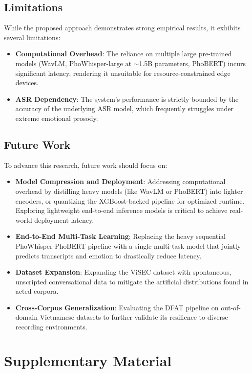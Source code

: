 \documentclass[12pt,a4paper]{report}
\begin{document}
\section{Limitations}
While the proposed approach demonstrates strong empirical results, it exhibits several limitations:
\begin{itemize}
    \item \textbf{Computational Overhead}: The reliance on multiple large pre-trained models (WavLM, PhoWhisper-large at $\sim$1.5B parameters, PhoBERT) incurs significant latency, rendering it unsuitable for resource-constrained edge devices.
    \item \textbf{ASR Dependency}: The system's performance is strictly bounded by the accuracy of the underlying ASR model, which frequently struggles under extreme emotional prosody.
\end{itemize}

\section{Future Work}
To advance this research, future work should focus on:
\begin{itemize}
    \item \textbf{Model Compression and Deployment}: Addressing computational overhead by distilling heavy models (like WavLM or PhoBERT) into lighter encoders, or quantizing the XGBoost-backed pipeline for optimized runtime. Exploring lightweight end-to-end inference models is critical to achieve real-world deployment latency.
    \item \textbf{End-to-End Multi-Task Learning}: Replacing the heavy sequential PhoWhisper-PhoBERT pipeline with a single multi-task model that jointly predicts transcripts and emotion to drastically reduce latency.
    \item \textbf{Dataset Expansion}: Expanding the ViSEC dataset with spontaneous, unscripted conversational data to mitigate the artificial distributions found in acted corpora.
    \item \textbf{Cross-Corpus Generalization}: Evaluating the DFAT pipeline on out-of-domain Vietnamese datasets to further validate its resilience to diverse recording environments.
\end{itemize}

\appendix
\chapter{Supplementary Material}
\end{document}
